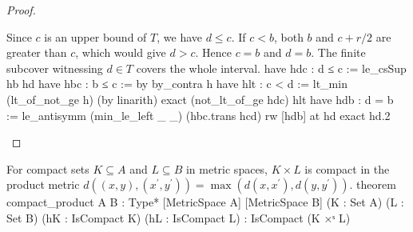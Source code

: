 \begin{proof}
  \begin{lean}{Since $c$ is an upper bound of $T$, we have $d\leq c$. If $c<b$, both $b$ and $c+r/2$ are greater than $c$, which would give $d>c$. Hence $c=b$ and $d=b$. The finite subcover witnessing $d\in T$ covers the whole interval.}
    have hdc : d ≤ c := le_csSup hb hd
    have hbc : b ≤ c := by
      by_contra h
      have hlt : c < d := lt_min (lt_of_not_ge h) (by linarith)
      exact (not_lt_of_ge hdc) hlt
    have hdb : d = b := le_antisymm (min_le_left _ _) (hbc.trans hcd)
    rw [hdb] at hd
    exact hd.2
  \end{lean}

\end{proof}

\begin{lemma} \label{an1:lem:compact-product}
  \begin{lean}{For compact sets $K\subseteq A$ and $L\subseteq B$ in metric spaces, $K\times L$ is compact in the product metric $d((x,y),(x^{\prime},y^{\prime}))=\max(d(x,x^{\prime}),d(y,y^{\prime}))$.}
    theorem compact_product {A B : Type*} [MetricSpace A] [MetricSpace B]
        (K : Set A) (L : Set B) (hK : IsCompact K) (hL : IsCompact L) :
        IsCompact (K ×ˢ L)
  \end{lean}
\end{lemma}

